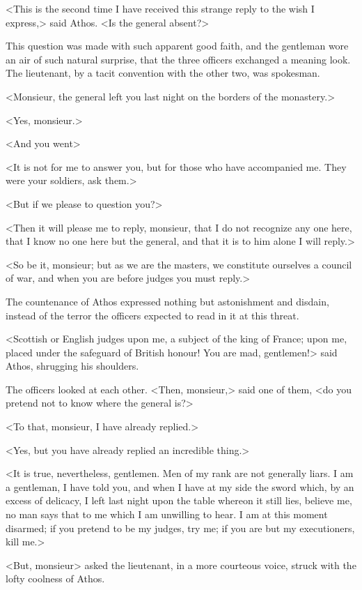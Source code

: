 <This is the second time I have received this strange reply to the wish I express,> said Athos. <Is the general absent?>

This question was made with such apparent good faith, and the gentleman wore an air of such natural surprise, that the three officers exchanged a meaning look. The lieutenant, by a tacit convention with the other two, was spokesman.

<Monsieur, the general left you last night on the borders of the monastery.>

<Yes, monsieur.>

<And you went\longdash>

<It is not for me to answer you, but for those who have accompanied me. They were your soldiers, ask them.>

<But if we please to question you?>

<Then it will please me to reply, monsieur, that I do not recognize any one here, that I know no one here but the general, and that it is to him alone I will reply.>

<So be it, monsieur; but as we are the masters, we constitute ourselves a council of war, and when you are before judges you must reply.>

The countenance of Athos expressed nothing but astonishment and disdain, instead of the terror the officers expected to read in it at this threat.

<Scottish or English judges upon me, a subject of the king of France; upon me, placed under the safeguard of British honour! You are mad, gentlemen!> said Athos, shrugging his shoulders.

The officers looked at each other. <Then, monsieur,> said one of them, <do you pretend not to know where the general is?>

<To that, monsieur, I have already replied.>

<Yes, but you have already replied an incredible thing.>

<It is true, nevertheless, gentlemen. Men of my rank are not generally liars. I am a gentleman, I have told you, and when I have at my side the sword which, by an excess of delicacy, I left last night upon the table whereon it still lies, believe me, no man says that to me which I am unwilling to hear. I am at this moment disarmed; if you pretend to be my judges, try me; if you are but my executioners, kill me.>

<But, monsieur\longdash> asked the lieutenant, in a more courteous voice, struck with the lofty coolness of Athos.

